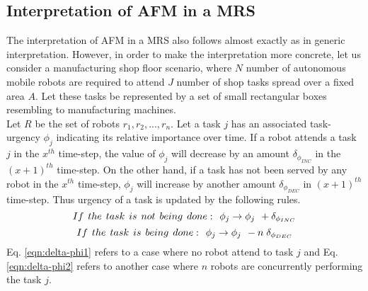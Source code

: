 \subsection{Interpretation of AFM in a MRS}
The interpretation of AFM in a MRS also follows almost exactly as in generic interpretation. However, in order to make the interpretation more concrete, let us consider a manufacturing shop floor scenario, where $N$ number of autonomous mobile robots are required to attend $J$ number of shop tasks spread over a fixed area $A$. Let these tasks be represented by a set of small rectangular boxes resembling to manufacturing machines.\\
Let $R$ be the set of robots ${r_1, r_2,...,r_n}$. Let a task $j$ has an associated task-urgency $\phi_j$ indicating its relative importance over time.
If a robot attends a task $j$ in the $x^{th}$ time-step, the value of $\phi_j$ will decrease by an amount $\delta_{\phi_{INC}}$ in the $(x+1)^{th}$ time-step.
On the other hand, if a task has not been served by any robot in the $x^{th}$ time-step, $\phi_j$ will increase by another amount  $\delta_{\phi_{DEC}}$  in $(x+1)^{th}$ time-step. Thus
urgency of a task is updated by the following rules.
\begin{equation}
 If\hspace*{0.15cm}the\hspace*{0.15cm} task\hspace*{0.15cm}is\hspace*{0.15cm}not\hspace*{0.15cm}being\hspace*{0.15cm} done:\hspace*{0.15cm}  \phi_j \rightarrow   \phi_j \hspace*{0.15cm} + \delta_{\phi_{INC}}
\label{eqn:delta-phi1}
\end{equation}
\begin{equation}
 If\hspace*{0.15cm}the \hspace*{0.15cm}task\hspace*{0.15cm}is\hspace*{0.15cm}being\hspace*{0.15cm}done:\hspace*{0.15cm}  \phi_j \rightarrow   \phi_j \hspace*{0.15cm} - n\hspace*{0.10cm}\delta_{\phi_{DEC}}
\label{eqn:delta-phi2}
\end{equation}
Eq. \ref{eqn:delta-phi1} refers to a case where no robot attend to task $j$ and Eq. \ref{eqn:delta-phi2} refers to another case where $n$ robots are concurrently performing the task $j$.\\
